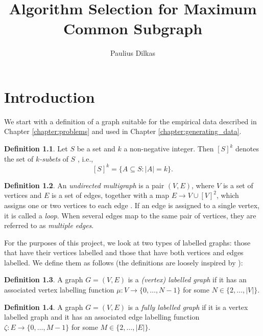 \documentclass{l4proj}
\title{Algorithm Selection for Maximum Common Subgraph}
\author{Paulius Dilkas}
\theoremstyle{definition}
\newtheorem{definition}{Definition}[chapter]
\theoremstyle{remark}
\begin{document}
\maketitle


\educationalconsent
\tableofcontents

\chapter{Introduction}

We start with a definition of a graph suitable for the empirical data described
in Chapter \ref{chapter:problems} and used in Chapter
\ref{chapter:generating_data}.

\begin{definition}
  Let $S$ be a set and $k$ a non-negative integer. Then $[S]^k$ denotes
  the set of \emph{$k$-subets} of $S$ \cite{subset}, i.e.,
  \[ [S]^k = \{ A \subseteq S : |A| = k \}. \]
\end{definition}

\begin{definition} \label{def:graph}
  An \emph{undirected multigraph} is a pair $(V, E)$, where $V$ is a set of
  vertices and $E$ is a set of edges, together with a map $E \to V \cup [V]^2$,
  which assigns one or two vertices to each edge
  \cite{DBLP:books/daglib/0030488}. If an edge is assigned to a single vertex,
  it is called a \emph{loop}. When several edges map to the same pair of
  vertices, they are referred to as \emph{multiple edges}. 
\end{definition}

For the purposes of this project, we look at two types of labelled graphs: those
that have their vertices labelled and those that have both vertices and edges
labelled. We define them as follows (the definitions are loosely inspired by
\cite{abu-aisheh_2016}):

\begin{definition} \label{def:vertex_label}
  A graph $G = (V, E)$ is a \emph{(vertex) labelled graph} if it has an associated
  vertex labelling function $\mu \colon V \to \{ 0, \dots, N - 1 \}$ for some $N
  \in \{2, \dots, |V| \}$.
\end{definition}

\begin{definition} \label{def:edge_label}
  A graph $G = (V, E)$ is a \emph{fully labelled graph} if it is a vertex labelled
  graph and it has an associated edge labelling function $\zeta \colon E \to
  \{ 0, \dots, M - 1 \}$ for some $M \in \{ 2, \dots, |E| \}$.
\end{definition}
\end{document}
